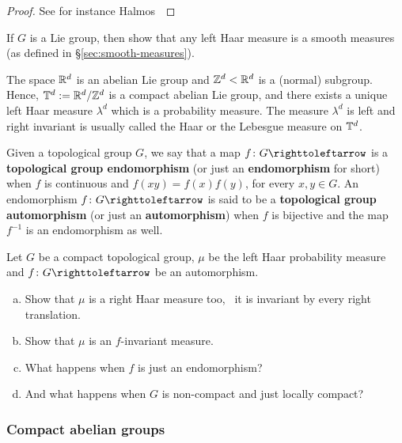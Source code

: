 \begin{proof}
  See for instance Halmos~\cite[\S58]{HalmosMeasureTheory}
\end{proof}

\begin{exercise}
  If $G$ is a Lie group, then show that any left Haar measure is a smooth measures (as defined in \S\ref{sec:smooth-measures}).
\end{exercise}

\begin{example}
  The space $\mathbb{R}^{d}$ is an abelian Lie group and $\mathbb{Z}^{d}<\mathbb{R}^{d}$ is a (normal) subgroup. Hence, $\mathbb{T}^{d}:=\mathbb{R}^{d}/\mathbb{Z}^{d}$ is a compact abelian Lie group, and there exists a unique left Haar measure $\lambda^{d}$ which is a probability measure. The measure $\lambda^{d}$ is left and right invariant is usually called the Haar or the Lebesgue measure on $\mathbb{T}^{d}$.
\end{example}

Given a topological group $G$, we say that a map $f\colon G\carr$ is a \textbf{topological group endomorphism} (or just an \textbf{endomorphism} for short) when $f$ is continuous and $f(xy)=f(x)f(y)$, for every $x,y\in G$. An endomorphism $f\colon G\carr$ is said to be a \textbf{topological group automorphism} (or just an \textbf{automorphism}) when $f$ is bijective and the map $f^{-1}$ is an endomorphism as well.

\begin{exercise}\label{exer:Haar-compact-groups}
  Let $G$ be a compact topological group, $\mu$ be the left Haar probability measure and $f\colon G\carr$ be an automorphism.
  \begin{enumerate}[(a)]
    \item Show that $\mu$ is a right Haar measure too, \ie~it is invariant by every right translation.
    \item Show that $\mu$ is an $f$-invariant measure.

    \item What happens when $f$ is just an endomorphism?

    \item And what happens when $G$ is non-compact and just locally compact?
  \end{enumerate}
\end{exercise}


\subsubsection{Compact abelian groups}
\label{sec:compact-abelian-groups}

